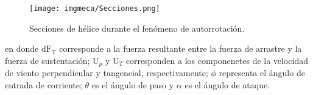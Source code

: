 \begin{figure}[H]
	\centering
	\texttt{[image: imgmeca/Secciones.png]}
	\caption{Secciones de h\'elice durante el fen\'omeno de autorrotaci\'on.}
	\label{img:Secciones}
\end{figure}

\noindent en donde $\text{dF}_{\text{T}}$ corresponde a la fuerza resultante entre la fuerza de arrastre y la fuerza de sustentaci\'on; $\text{U}_{p}$ y $\text{U}_{T}$ corresponden a los componenetes de la velocidad de viento perpendicular y tangencial, respectivamente; $\phi$ representa el \'angulo de entrada de corriente; $\theta$ es el \'angulo de paso y $\alpha$ es el \'angulo de ataque.
